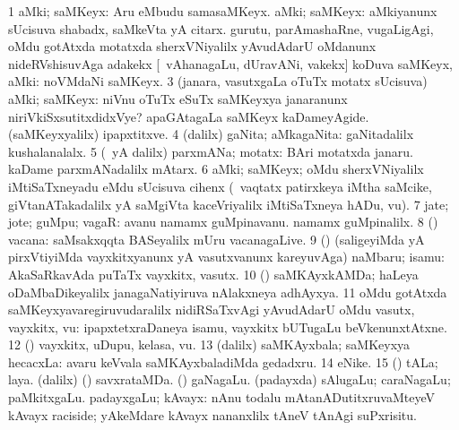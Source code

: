 \bentry
{}
\gl{\nA}
\bmng
\bnum
\num{1} aMki; saMKeyx:  Aru eMbudu samasaMKeyx. 
 aMki; saMKeyx: 
\banum
{} aMkiyanunx sUcisuva shabadx, saMkeVta yA citarx. 
 gurutu, parAmashaRne, \mo vugaLigAgi, oMdu gotAtxda motatxda sherxVNiyalilx yAvudAdarU oMdanunx nideRVshisuvAga adakekx [\udA\ vAhanagaLu, dUravANi, \mo vakekx] koDuva saMKeyx, aMki:  noVMdaNi saMKeyx. 
\eanum
\numie
\num{3} (janara, vasutxgaLa oTuTx motatx sUcisuva) aMki; saMKeyx:  niVnu oTuTx eSuTx saMKeyxya janaranunx niriVkiSxsutitxdidxVye?  apaGAtagaLa saMKeyx kaDameyAgide.  (saMKeyxyalilx) ipapxtitxve. 
\num{4} (\bava dalilx) gaNita; aMkagaNita:  gaNitadalilx kushalanalalx. 
\num{5} (\Eva\ yA \bava dalilx) parxmANa; motatx:  BAri motatxda janaru.  kaDame parxmANadalilx mAtarx. 
\num{6} aMki; saMKeyx; oMdu sherxVNiyalilx iMtiSaTxneyadu eMdu sUcisuva cihenx (\kanmu\ vaqtatx patirxkeya iMtha saMcike, giVtanATakadalilx yA saMgiVta kaceVriyalilx iMtiSaTxneya hADu, \mo vu). 
\num{7} jate; jote; guMpu; vagaR:  avanu namamx guMpinavanu.  namamx guMpinalilx. 
\num{8} (\vAyx) vacana:  saMsakxqqta BASeyalilx mUru vacanagaLive. 
\num{9} (\AmA) (saligeyiMda yA pirxVtiyiMda vayxkitxyanunx yA vasutxvanunx kareyuvAga) naMbaru; isamu:  AkaSaRkavAda puTaTx vayxkitx, vasutx. 
\num{10} (\beY) saMKAyxkAMDa; haLeya oDaMbaDikeyalilx janagaNatiyiruva nAlakxneya adhAyxya. 
\num{11} oMdu gotAtxda saMKeyxyavaregiruvudaralilx nidiRSaTxvAgi yAvudAdarU oMdu vasutx, vayxkitx, \mo vu:  ipapxtetxraDaneya isamu, vayxkitx bUTugaLu beVkenunxtAtxne. 
\num{12} (\AmA) vayxkitx, uDupu, kelasa, \mo vu. 
\num{13} (\bava dalilx) saMKAyxbala; saMKeyxya hecacxLa:  avaru keVvala saMKAyxbaladiMda gedadxru. 
\num{14} eNike. 
\num{15} (\pArxparx) tALa; laya. 
 (\bava dalilx) 
\banum
{} (\saM) savxrataMDa. 
 (\CaM) gaNagaLu. 
 (padayxda) sAlugaLu; caraNagaLu; paMkitxgaLu. 
 padayxgaLu; kAvayx:  nAnu todalu mAtanADutitxruvaMteyeV kAvayx raciside; yAkeMdare kAvayx nananxlilx tAneV tAnAgi suPxrisitu. 
\eanum
\numie
\enum
\emng

